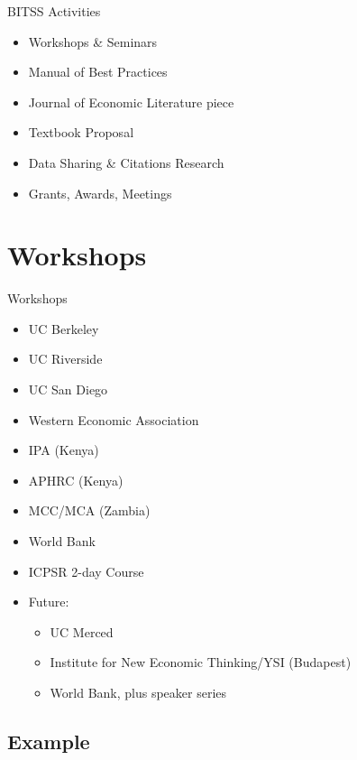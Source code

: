\documentclass{beamer}
\begin{document}
\begin{frame}{BITSS Activities}
\begin{itemize}[<.->]
\item Workshops \& Seminars
\item Manual of Best Practices
\item Journal of Economic Literature piece
\item Textbook Proposal
\item Data Sharing \& Citations Research 
\item Grants, Awards, Meetings
\end {itemize}
\end{frame}

\section{Workshops}
\begin{frame}{Workshops}
\begin{itemize}
\item UC Berkeley
\item UC Riverside
\item UC San Diego
\item Western Economic Association
\item IPA (Kenya)
\item APHRC (Kenya)
\item MCC/MCA (Zambia)
\item World Bank
\item ICPSR 2-day Course \href{http://www.github.com/bitss/icpsr2016}{} 
\item Future:
	\begin{itemize}
	\item UC Merced
	\item Institute for New Economic Thinking/YSI (Budapest)
	\item World Bank, plus speaker series
	\end{itemize}
\end{itemize}
\end{frame}
\subsection*{Example}
\end{document}
